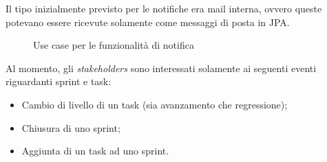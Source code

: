 Il tipo inizialmente previsto per le notifiche era mail interna, ovvero queste
potevano essere ricevute solamente come messaggi di posta in JPA.

\begin{figure}[H]
  \vspace*{\fill}
  \caption{Use case per le funzionalità di notifica}
  \label{fig:uc-notif}
\end{figure}

Al momento, gli \emph{stakeholders} sono interessati solamente ai seguenti
eventi riguardanti sprint e task:

\begin{itemize}
\item Cambio di livello di un task (sia avanzamento che regressione);
\item Chiusura di uno sprint;
\item Aggiunta di un task ad uno sprint.
\end{itemize}

